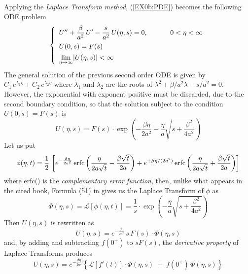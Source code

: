 \documentclass[a4paper,10pt]{report}%
\begin{document}
Applying the {\em Laplace Transform method}, (\ref{EX0b:PDE}) becomes the following ODE problem
\begin{equation}\label{ODE_Ex0b}
\left\{\begin{array}{lcl}
U'' + \dfrac{\beta}{a^2}\,U' - \dfrac{s}{a^2}\,U(\eta,s) = 0, & \hspace*{.5cm} & 0<\eta<\infty \\[8pt]
U(0,s) = F(s) \\[4pt]
\displaystyle{\lim_{\eta\rightarrow\infty}}|U(\eta,s)|<\infty
\end{array}\right.
\end{equation}
The general solution of the previous second order ODE is given by $C_1\,e^{\lambda_1\eta} + C_2\,e^{\lambda_2\eta}$
where $\lambda_1$ and $\lambda_2$ are the roots of $\lambda^2+\beta/a^2\lambda-s/a^2=0$.
However, the exponential with exponent positive must be discarded, due to the second boundary condition, so that %
the solution subject to the condition $U(0,s)=F(s)$ is %
\[
U(\eta,s) = F(s)\cdot\exp\left( -\frac{\beta\eta}{2a^2} - \frac{\eta}{a}\sqrt{s+\dfrac{\beta^2}{4a^2}} \right) %
\]
Let us put
\[
\phi(\eta,t) = \frac{1}{2}\,\left[ e^{-\frac{\beta\eta}{2a^2}}\,{\rm erfc}\left( \frac{\eta}{2a\sqrt{t}} - \frac{\beta\sqrt{t}}{2a} \right) + e^{+\beta\eta/(2a^2)}\,{\rm erfc}\left( \frac{\eta}{2a\sqrt{t}} + \frac{\beta\sqrt{t}}{2a} \right) \right]
\]
where erfc() is the {\em complementary error function}, then, unlike what appears in the cited book,
Formula (51) in \cite{GHIZZETTI:OSSICINI} %
gives us the Laplace Transform of $\phi$ as
\[
\Phi(\eta,s) = \mathscr{L}\left[ \phi(\eta,t) \right] = \frac{1}{s}\cdot\exp\left(-\frac{\eta}{a}\sqrt{s+\dfrac{\beta^2}{4a^2}}\right)
\]
Then $U(\eta,s)$ is rewritten as
\[
U(\eta,s) = e^{-\frac{\beta\eta}{2a^2}}\,s\,F(s)\cdot\Phi(\eta,s)
\]
and, by adding and subtracting $f(0^+)$ to $sF(s)$, the {\em derivative property} of Laplace Transforms produces
\[
U(\eta,s)
 = e^{-\frac{\beta\eta}{2a^2}}\left\{\mathscr{L}\left[f'(t)\right]\cdot\Phi(\eta,s) \;+\; f(0^+)\,\Phi(\eta,s)\right\}
\]
\end{document}
